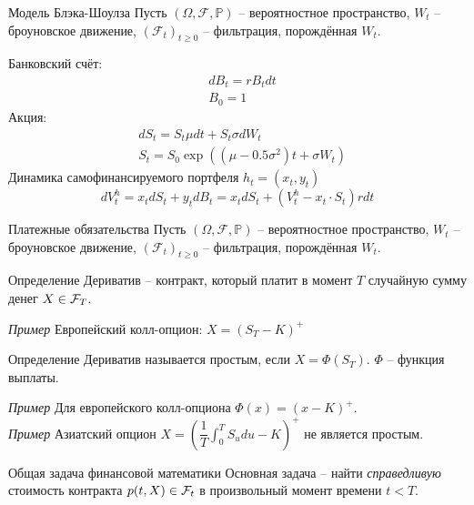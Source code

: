 \documentclass[aspectratio=169]{beamer}
\begin{document}
\begin{frame}{Модель Блэка-Шоулза}
    Пусть $(\Omega, \mathcal{F}, \mathbb{P})$ -- вероятностное пространство, $W_t$ -- броуновское движение, $(\mathcal{F}_t)_{t\geq 0}$ -- фильтрация, порождённая $W_t$. 
    \pause
    
    Банковский счёт:
    \begin{align*}
        &dB_t = r B_t dt \\
        &B_0 = 1
    \end{align*}\noident Акция:
    \begin{align*}
        &dS_t = S_t \mu dt + S_t \sigma dW_t \\
        &S_t = S_0 \exp\left( \left(\mu - 0.5 \sigma^2 \right) t + \sigma W_t \right)
    \end{align*}
    Динамика самофинансируемого портфеля $h_t = (x_t, y_t)$
    $$
        dV_t^h = x_t dS_t + y_t dB_t = x_t dS_t + (V_t^h - x_t\cdot S_t) r dt 
    $$
\end{frame}

\begin{frame}{Платежные обязательства}
    Пусть $(\Omega, \mathcal{F}, \mathbb{P})$ -- вероятностное пространство, 
    $W_t$ -- броуновское движение, $(\mathcal{F}_t)_{t\geq 0}$ -- фильтрация, порождённая $W_t$.
    \begin{block}{Определение}
        Дериватив -- контракт, который платит в момент $T$ случайную сумму денег $X \in \mathcal{F}_T$.
    \end{block}
    \pause
    \textit{Пример} Европейский колл-опцион: $X = (S_T - K)^+$
    \pause
    \begin{block}{Определение}
        Дериватив называется простым, если $X = \Phi(S_T)$. $\Phi$ -- функция выплаты.
    \end{block}
    \pause
    \textit{Пример} Для европейского колл-опциона $\Phi(x) = (x-K)^+$. \\
    \pause
    \textit{Пример} Азиатский опцион $X = \left( \dfrac{1}{T} \int_0^T S_u du - K\right)^+$ не является простым. 
\end{frame}

\begin{frame}{Общая задача финансовой математики}
    Основная задача -- найти \textit{справедливую} стоимость контракта $p(t, X) \in \mathcal{F}_t$ в произвольный момент времени $t < T$.
\end{frame}
\end{document}
